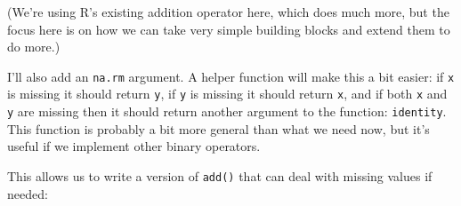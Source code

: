 \begin{Shaded}
\begin{Highlighting}[]
\StringTok{ }
  \NormalTok{(}\StringTok{ }\NormalTok{, }\StringTok{ }\NormalTok{,}
  \StringTok{ }
\NormalTok{\}}
\end{Highlighting}
\end{Shaded}

(We're using R's existing addition operator here, which does much more,
but the focus here is on how we can take very simple building blocks and
extend them to do more.)

I'll also add an \texttt{na.rm} argument. A helper function will make
this a bit easier: if \texttt{x} is missing it should return \texttt{y},
if \texttt{y} is missing it should return \texttt{x}, and if both
\texttt{x} and \texttt{y} are missing then it should return another
argument to the function: \texttt{identity}. This function is probably a
bit more general than what we need now, but it's useful if we implement
other binary operators.

\begin{Shaded}
\begin{Highlighting}[]
\StringTok{ }
  \StringTok{ }
  \NormalTok{\}}
\NormalTok{\}}
\NormalTok{(}\NormalTok{, }\NormalTok{, }\NormalTok{)}
\NormalTok{(}\NormalTok{, }\NormalTok{, }\NormalTok{)}
\NormalTok{(}\NormalTok{, }\NormalTok{, }\NormalTok{)}
\end{Highlighting}
\end{Shaded}

This allows us to write a version of \texttt{add()} that can deal with
missing values if needed:

